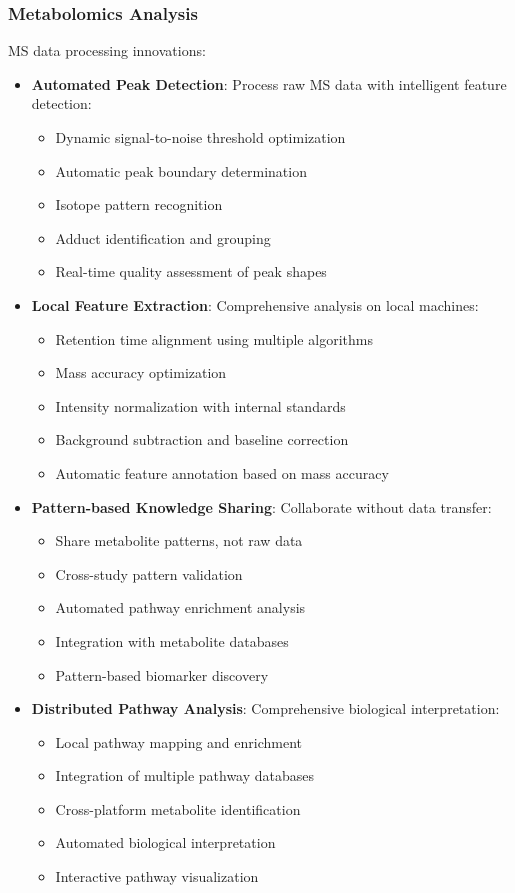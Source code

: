\documentclass[11pt,a4paper]{article}
\begin{document}
\subsubsection{Metabolomics Analysis}
MS data processing innovations:
\begin{itemize}
    \item \textbf{Automated Peak Detection}: Process raw MS data with intelligent feature detection:
    \begin{itemize}
        \item Dynamic signal-to-noise threshold optimization
        \item Automatic peak boundary determination
        \item Isotope pattern recognition
        \item Adduct identification and grouping
        \item Real-time quality assessment of peak shapes
    \end{itemize}
    
    \item \textbf{Local Feature Extraction}: Comprehensive analysis on local machines:
    \begin{itemize}
        \item Retention time alignment using multiple algorithms
        \item Mass accuracy optimization
        \item Intensity normalization with internal standards
        \item Background subtraction and baseline correction
        \item Automatic feature annotation based on mass accuracy
    \end{itemize}
    
    \item \textbf{Pattern-based Knowledge Sharing}: Collaborate without data transfer:
    \begin{itemize}
        \item Share metabolite patterns, not raw data
        \item Cross-study pattern validation
        \item Automated pathway enrichment analysis
        \item Integration with metabolite databases
        \item Pattern-based biomarker discovery
    \end{itemize}
    
    \item \textbf{Distributed Pathway Analysis}: Comprehensive biological interpretation:
    \begin{itemize}
        \item Local pathway mapping and enrichment
        \item Integration of multiple pathway databases
        \item Cross-platform metabolite identification
        \item Automated biological interpretation
        \item Interactive pathway visualization
    \end{itemize}
\end{itemize}
\end{document}
